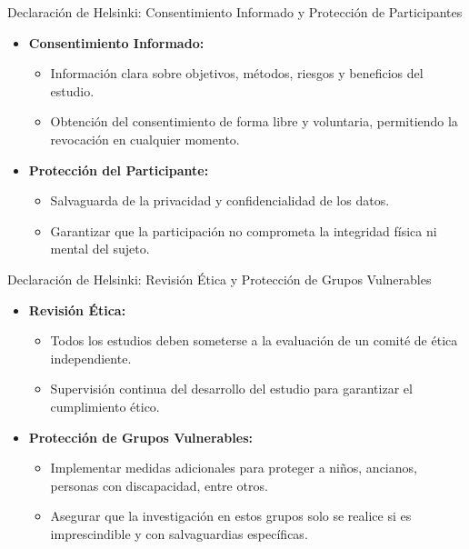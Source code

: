 ﻿\documentclass{beamer}
\begin{document}
\begin{frame}{Declaración de Helsinki: Consentimiento Informado y Protección de Participantes}
\begin{itemize}
    \item \textbf{Consentimiento Informado:}
    \begin{itemize}
         \item Información clara sobre objetivos, métodos, riesgos y beneficios del estudio.
         \item Obtención del consentimiento de forma libre y voluntaria, permitiendo la revocación en cualquier momento.
    \end{itemize}
    \item \textbf{Protección del Participante:}
    \begin{itemize}
         \item Salvaguarda de la privacidad y confidencialidad de los datos.
         \item Garantizar que la participación no comprometa la integridad física ni mental del sujeto.
    \end{itemize}
\end{itemize}
\end{frame}

\begin{frame}{Declaración de Helsinki: Revisión Ética y Protección de Grupos Vulnerables}
\begin{itemize}
    \item \textbf{Revisión Ética:}
    \begin{itemize}
         \item Todos los estudios deben someterse a la evaluación de un comité de ética independiente.
         \item Supervisión continua del desarrollo del estudio para garantizar el cumplimiento ético.
    \end{itemize}
    \item \textbf{Protección de Grupos Vulnerables:}
    \begin{itemize}
         \item Implementar medidas adicionales para proteger a niños, ancianos, personas con discapacidad, entre otros.
         \item Asegurar que la investigación en estos grupos solo se realice si es imprescindible y con salvaguardias específicas.
    \end{itemize}
\end{itemize}
\end{frame}
\end{document}
